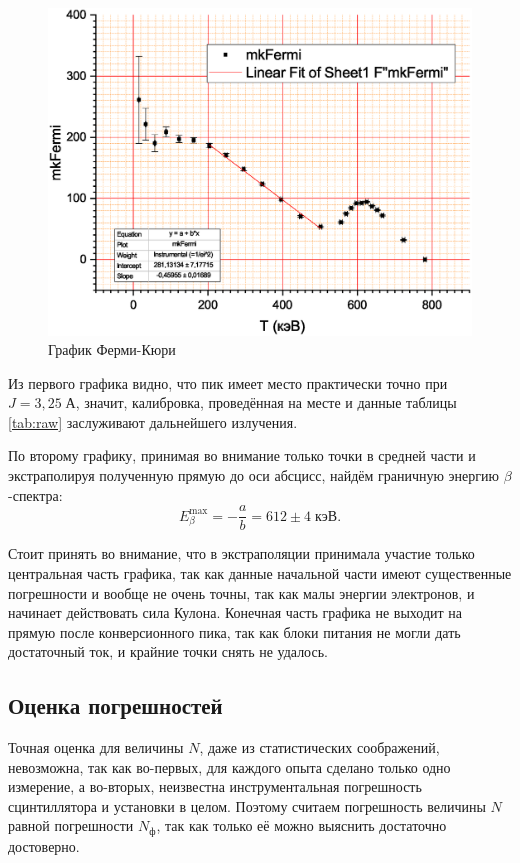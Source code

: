 \documentclass[a4paper]{article}
\newcommand{\btt}{$\beta $}
\begin{document}
	\begin{figure}
		\centering
		\includegraphics[width=0.9\linewidth]{Graph2}
		\caption{График Ферми-Кюри}
		\label{fig:graph2}
	\end{figure}
	
	Из первого графика видно, что пик имеет место практически точно при $ J = 3,25\; А $, значит, калибровка, проведённая на месте и данные таблицы \ref{tab:raw} заслуживают дальнейшего излучения.
	
	По второму графику, принимая во внимание только точки в средней части и экстраполируя полученную прямую до оси абсцисс, найдём граничную энергию \btt-спектра:
	\[E_\beta^\mathrm{max} = - \dfrac{a}{b} = 612\pm 4 \; кэВ.\]

	Стоит принять во внимание, что в экстраполяции принимала участие только центральная часть графика, так как данные начальной части имеют существенные погрешности и вообще не очень точны, так как малы энергии электронов, и начинает действовать сила Кулона. Конечная часть графика не выходит на прямую после конверсионного пика, так как блоки питания не могли дать достаточный ток, и крайние точки снять не удалось.
	
	\subsection{Оценка погрешностей}
		
		\label{sec:error}
		
	Точная оценка для величины $ N $, даже из статистических соображений, невозможна, так как во-первых, для каждого опыта сделано только одно измерение, а во-вторых, неизвестна инструментальная погрешность сцинтиллятора и установки в целом. Поэтому считаем погрешность величины $ N $ равной погрешности $ N_ф $, так как только её можно выяснить достаточно достоверно.
		
\end{document}
